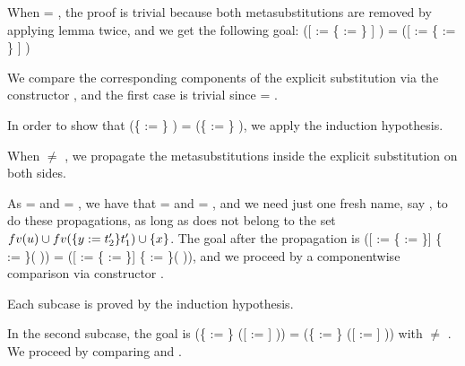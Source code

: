 When  = , the proof is trivial because both metasubstitutions are removed by applying lemma  twice, and we get the following goal: ([ := \{ := \} ] ) = ([ := \{ := \} ] )\begin{coqdoccode}
 \end{coqdoccode}
We compare the corresponding components of the explicit substitution via the constructor , and the first case is trivial since  = .
\begin{coqdoccode}
\end{coqdoccode}
In order to show that (\{ := \} ) = (\{ := \} ), we apply the induction hypothesis.
\begin{coqdoccode}
\end{coqdoccode}
When  \ensuremath{\not=} , we propagate the metasubstitutions inside the explicit substitution on both sides.\begin{coqdoccode}
 \end{coqdoccode}
As  =  and  = , we have that   =   and   =  , and we need just one fresh name, say , to do these propagations, as long as  does not belong to the set $fv(u)\cup fv(\metasub{t_1'}{y}{t_2'})\cup \{x\}$. The goal after the propagation is ([ := \{ := \}] \{ := \}(   )) = ([ := \{ := \}] \{ := \}(   )), and we proceed by a componentwise comparison via constructor .\begin{coqdoccode}
 \end{coqdoccode}
Each subcase is proved by the induction hypothesis.
\begin{coqdoccode}
\end{coqdoccode}
 In the second subcase, the goal is (\{ := \} ([ := ] )) = (\{ := \} ([ := ] )) with  \ensuremath{\not=} . We proceed by comparing  and .
